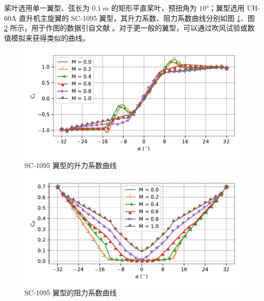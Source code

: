 桨叶选用单一翼型、弦长为 $\SI{0.1}{m}$ 的矩形平直桨叶，预扭角为 $\ang{10}$；翼型选用 UH-60A 直升机主旋翼的
SC-1095 翼型，其升力系数、阻力系数曲线分别如图 \ref{fig:rotor_c_lift}、图 \ref{fig:rotor_c_drag}
所示，用于作图的数据引自文献 \cite{Howlett_1981}。对于更一般的翼型，可以通过吹风试验或数值模拟来获得类似的曲线。

\begin{figure}[h!]
\begin{centering}
\includegraphics[width=1\textwidth,height=0.26\textheight,keepaspectratio]{figures/airfoil/lift}
\par\end{centering}
\caption{\label{fig:rotor_c_lift}SC-1095 翼型的升力系数曲线}
\end{figure}

\begin{figure}[h!]
\begin{centering}
\includegraphics[width=1\textwidth,height=0.26\textheight,keepaspectratio]{figures/airfoil/drag}
\par\end{centering}
\caption{\label{fig:rotor_c_drag}SC-1095 翼型的阻力系数曲线}
\end{figure}

